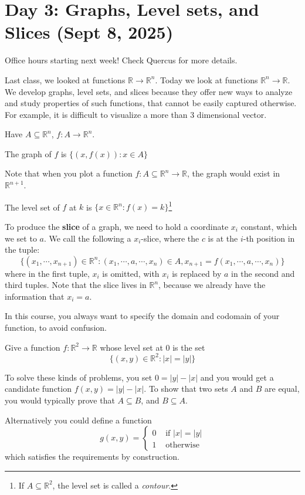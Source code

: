 \section{Day 3: Graphs, Level sets, and Slices (Sept 8, 2025)}

Office hours starting next week! Check Quercus for more details.

Last class, we looked at functions $\mathbb{R} \to \mathbb{R}^n$. Today we look at functions $\mathbb{R}^n \to \mathbb{R}$. We develop graphs, level sets, and slices because they offer new ways to analyze and study properties of such functions, that cannot be easily captured otherwise. For example, it is difficult to visualize a more than 3 dimensional vector.

\noindent Have $A \subseteq \mathbb{R}^n$, $f : A \to \mathbb{R}^n$.

\begin{definition}[Graph]
    The graph of $f$ is $\{ (x, f(x)) : x \in A \}$ 
\end{definition}

Note that when you plot a function $f : A \subseteq \mathbb{R}^n \to \mathbb{R}$, the graph would exist in $\mathbb{R}^{n+1}$.

\begin{definition}
    The level set of $f$ at $k$ is $\{ x \in \mathbb{R}^n : f(x) = k \}$\footnote{If $A \subseteq \mathbb{R}^2$, the level set is called a \textit{contour}.}
\end{definition}

To produce the \textbf{slice} of a graph, we need to hold a coordinate $x_i$ constant, which we set to $a$. We call the following a $x_i$-slice, where the $c$ is at the $i$-th position in the tuple: 
\[
\{ (x_1, \cdots, x_{n+1}) \in \mathbb{R}^n : (x_1, \cdots, a, \cdots, x_n) \in A,  x_{n+1} = f(x_1, \cdots, a, \cdots, x_n)\}
\]
where in the first tuple, $x_i$ is omitted, with $x_i$ is replaced by $a$ in the second and third tuples. Note that the slice lives in $\mathbb{R}^n$, because we already have the information that $x_i = a$.

 In this course, you always want to specify the domain and codomain of your function, to avoid confusion. 

\begin{problem}
    Give a function $f: \mathbb{R}^2 \to \mathbb{R}$ whose level set at $0$ is the set 
    \[
    \{ (x, y) \in \mathbb{R}^2: |x| = |y| \}
    \]
\end{problem}

To solve these kinds of problems, you set $0 = |y| - |x|$ and you would get a candidate function $f(x, y) = |y| - |x|$. To show that two sets $A$ and $B$ are equal, you would typically prove that $A \subseteq B$, and $B \subseteq A$.

Alternatively you could define a function
\[
g(x, y) = \begin{cases}
    0 &\text{ if } |x| = |y| \\
    1 &\text{ otherwise}
\end{cases}
\]
which satisfies the requirements by construction.
